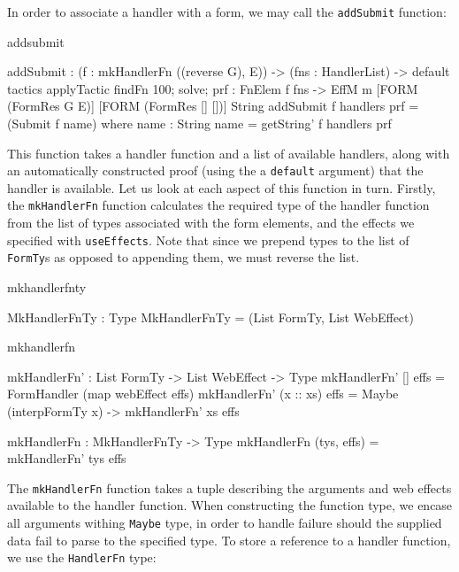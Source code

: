 \noindent
In order to associate a handler with a form, we may call the \texttt{addSubmit}
function:

\begin{SaveVerbatim}{addsubmit}

addSubmit : (f :  mkHandlerFn ((reverse G), E)) ->
            (fns : HandlerList) ->
            {default tactics 
              { applyTactic findFn 100; solve; }
              prf : FnElem f fns} ->
            EffM m [FORM (FormRes G E)]
                   [FORM (FormRes [] [])] 
                   String
addSubmit f handlers {prf} = (Submit f name)
    where name : String
          name = getString' f handlers prf          

\end{SaveVerbatim}

\noindent
This function takes a handler function and a list of available handlers, along with
an automatically constructed proof (using the a \texttt{default} argument) that the
handler is available.
Let us look at each aspect of this function in turn. Firstly, the
\texttt{mkHandlerFn} function calculates the required type of the handler
function from the list of types associated with the form elements, and the
effects we specified with \texttt{useEffects}. Note that since we prepend types
to the list of \texttt{FormTy}s as opposed to appending them, we must reverse
the list.

\begin{SaveVerbatim}{mkhandlerfnty}

MkHandlerFnTy : Type
MkHandlerFnTy = (List FormTy, List WebEffect)

\end{SaveVerbatim}

\begin{SaveVerbatim}{mkhandlerfn}

mkHandlerFn' : List FormTy -> List WebEffect -> Type
mkHandlerFn' [] effs = FormHandler (map webEffect effs) 
mkHandlerFn' (x :: xs) effs = Maybe (interpFormTy x) -> 
                              mkHandlerFn' xs effs 

mkHandlerFn : MkHandlerFnTy -> Type 
mkHandlerFn (tys, effs) = mkHandlerFn' tys effs 

\end{SaveVerbatim}



\noindent
The \texttt{mkHandlerFn} function takes a tuple describing the arguments and
web effects available to the handler function. When constructing the function
type, we encase all arguments withing \texttt{Maybe} type, in order to handle
failure should the supplied data fail to parse to the specified type.
%
To store a reference to a handler function, we use the \texttt{HandlerFn} type:

